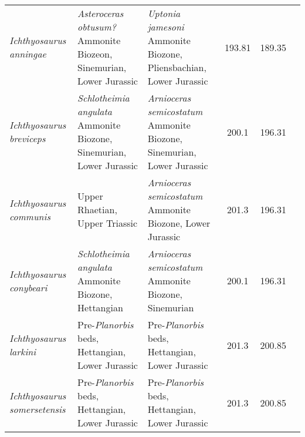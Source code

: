 \begin{longtabu}{>{\itshape}lXXSSl}
	Ichthyosaurus anningae                               & \emph{\emph{Asteroceras obtusum}?} Ammonite Biozeon, Sinemurian, Lower Jurassic                                                    & \emph{Uptonia jamesoni} Ammonite Biozone, Pliensbachian, Lower Jurassic                                                            & 193.81                   & 189.35                   & \cite{Lomax2015} \\                      
	Ichthyosaurus breviceps                              & \emph{Schlotheimia angulata} Ammonite Biozone, Sinemurian, Lower Jurassic                                                          & \emph{Arnioceras semicostatum} Ammonite Biozone, Sinemurian, Lower Jurassic                                                        & 200.1                    & 196.31                   & \cite{McGowan1974a} \\                   
	Ichthyosaurus communis                               & Upper Rhaetian, Upper Triassic                                                                                                     & \emph{Arnioceras semicostatum} Ammonite Biozone, Lower Jurassic                                                                    & 201.3                    & 196.31                   & \cite{McGowan1974a} \\                   
	Ichthyosaurus conybeari                              & \emph{Schlotheimia angulata} Ammonite Biozone, Hettangian                                                                          & \emph{Arnioceras semicostatum} Ammonite Biozone, Sinemurian                                                                        & 200.1                    & 196.31                   & \cite{McGowan1974a} \\                   
	Ichthyosaurus larkini                                & Pre-\emph{Planorbis} beds, Hettangian, Lower Jurassic                                                                              & Pre-\emph{Planorbis} beds, Hettangian, Lower Jurassic                                                                              & 201.3                    & 200.85                   & \cite{Lomax2017} \\                      
	Ichthyosaurus somersetensis                          & Pre-\emph{Planorbis} beds, Hettangian, Lower Jurassic                                                                              & Pre-\emph{Planorbis} beds, Hettangian, Lower Jurassic                                                                              & 201.3                    & 200.85                   & \cite{Lomax2017} \\                      

\end{longtabu}
